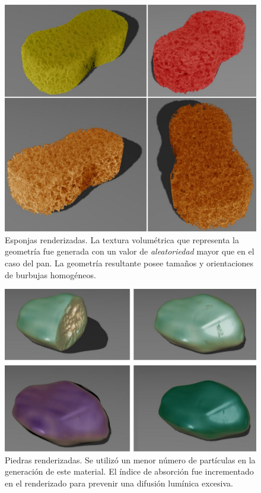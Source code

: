 \begin{figure}
  \centerline{\includegraphics[width=12cm]{figures/Fig13CAVW}}
  \caption{Esponjas renderizadas. La textura volumétrica que representa la geometría fue generada con un valor de {\em aleatoriedad} mayor que en el caso del pan. La geometría resultante posee tamaños y orientaciones de burbujas homogéneos.}
  \label{fg:Fig13}
\end{figure}

\begin{figure}
  \centerline{\includegraphics[width=12cm]{figures/Fig14CAVW}}
  \caption{Piedras renderizadas. Se utilizó un menor número de partículas en la generación de este material. El índice de absorción fue incrementado en el renderizado para prevenir una difusión lumínica excesiva.}
  \label{fg:Fig14}
\end{figure}

